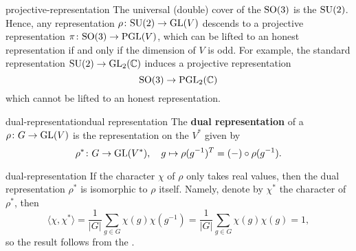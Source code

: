 \begin{example}{projective-representation}
    The universal (double) cover of the  $\textup{SO}(3)$ is the  $\textup{SU}(2)$. Hence, any representation $\rho \colon \textup{SU}(2) \to \textup{GL}(V)$ descends to a projective representation $\pi \colon \textup{SO}(3) \to \textup{PGL}(V)$, which can be lifted to an honest representation if and only if the dimension of $V$ is odd. For example, the standard representation $\textup{SU}(2) \to \textup{GL}_2(\mathbb{C})$ induces a projective representation
    \[ \textup{SO}(3) \to \textup{PGL}_2(\mathbb{C}) \]
    which cannot be lifted to an honest representation.
\end{example}


\begin{topic}{dual-representation}{dual representation}
    The \textbf{dual representation} of a  $\rho \colon G \to \textup{GL}(V)$ is the representation on the  $V^*$ given by
    \[ \rho^* \colon G \to \textup{GL}(V^*), \quad g \mapsto \rho(g^{-1})^T = (-) \circ \rho(g^{-1}) . \]
\end{topic}

\begin{example}{dual-representation}
    If the character $\chi$ of $\rho$ only takes real values, then the dual representation $\rho^*$ is isomorphic to $\rho$ itself. Namely, denote by $\chi^*$ the character of $\rho^*$, then
    \[ \langle \chi, \chi^* \rangle = \frac{1}{|G|} \sum_{g \in G} \chi(g) \chi(g^{-1}) = \frac{1}{|G|} \sum_{g \in G} \chi(g) \chi(g) = 1 , \]
    so the result follows from the .
\end{example}

